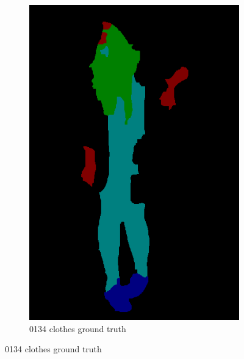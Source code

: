 \documentclass{csc_assignment5}
\begin{document}
\begin{description}
\begin{figure}[h!]
\begin{subfigure}[b]{0.3\textwidth}
        \includegraphics[width=\textwidth]{labels/0134_clothes.png}
        \caption{0134 clothes ground truth}
    \end{subfigure}
\end{figure}


\end{description}
\end{document}
